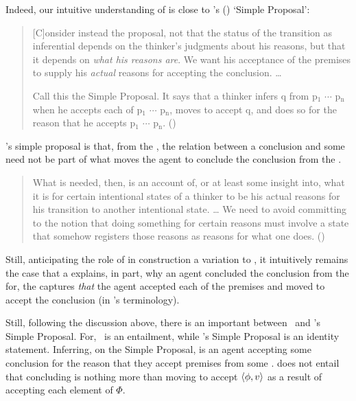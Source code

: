 \begin{note}
  Indeed, our intuitive understanding of \ros{} is close to \citeauthor{Wright:2014tt}'s (\citeyear{Wright:2014tt}) `Simple Proposal':
  \begin{quote}
    [C]onsider instead the proposal, not that the status of the transition as inferential depends on the thinker's judgments about his reasons, but that it depends on \emph{what his reasons are}.
    We want his acceptance of the premises to supply his \emph{actual} reasons for accepting the conclusion.
    \dots

    Call this the Simple Proposal.
    It says that a thinker infers q from p\(_{1}\) \(\cdots\) p\(_{\text{n}}\) when he accepts each of p\(_{1}\) \(\cdots\) p\(_{\text{n}}\), moves to accept q, and does so for the reason that he accepts p\(_{1}\) \(\cdots\) p\(_{\text{n}}\).%
    \mbox{}\hfill\mbox{(\citeyear[33]{Wright:2014tt})}
  \end{quote}

  \citeauthor{Wright:2014tt}'s simple proposal is that, from the \agpe{}, the relation between a conclusion and some \poP{} need not be part of what moves the agent to conclude the conclusion from the \poP{}.

  \begin{quote}
    What is needed, then, is an account of, or at least some insight into, what it is for certain intentional states of a thinker to be his actual reasons for his transition to another intentional state.
    \dots
    We need to avoid committing to the notion that doing something for certain reasons must involve a state that somehow registers those reasons as reasons for what one does.%
    \mbox{}\hfill\mbox{(\citeyear[34]{Wright:2014tt})}
  \end{quote}

  Still, anticipating the role of \ros{} in construction a variation to \qWhy{}, it intuitively remains the case that a \ros{} explains, in part, why an agent concluded the conclusion from the \poP{} for, the \ros{} captures \emph{that} the agent accepted each of the premises and moved to accept the conclusion (in \citeauthor{Wright:2014tt}'s terminology).

  Still, following the discussion above, there is an important between~\supportI{} and \citeauthor{Wright:2014tt}'s Simple Proposal.
  For,~\supportI{} is an entailment, while \citeauthor{Wright:2014tt}'s Simple Proposal is an identity statement.
  Inferring, on the Simple Proposal, is an agent accepting some conclusion for the reason that they accept premises from some \poP{}.
  \supportI{} does not entail that concluding is nothing more than moving to accept \(\langle \phi, v \rangle\) as a result of accepting each element of \(\Phi\).
\end{note}

